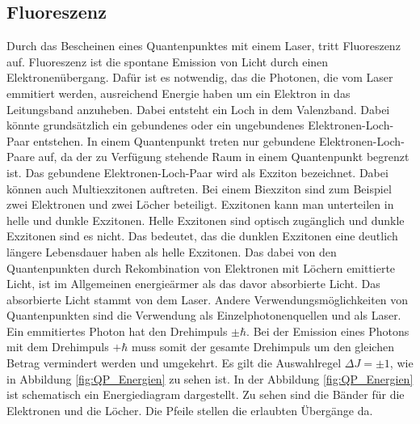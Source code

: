 \subsection{Fluoreszenz}
Durch das Bescheinen eines Quantenpunktes mit einem Laser, tritt Fluoreszenz auf. Fluoreszenz ist die spontane Emission von Licht durch einen Elektronenübergang. Dafür ist es notwendig, das die Photonen, die vom Laser emmitiert werden, ausreichend  Energie haben um ein Elektron in das Leitungsband anzuheben. Dabei entsteht ein Loch in dem Valenzband. Dabei könnte grundsätzlich  ein gebundenes oder ein ungebundenes Elektronen-Loch-Paar entstehen. 
In einem Quantenpunkt treten nur gebundene Elektronen-Loch-Paare auf, da der zu Verfügung stehende  Raum in einem Quantenpunkt begrenzt ist.
 Das gebundene Elektronen-Loch-Paar wird als Exziton bezeichnet. Dabei können auch Multiexzitonen auftreten. Bei einem Biexziton sind zum Beispiel zwei Elektronen und zwei Löcher beteiligt. 
 Exzitonen kann man unterteilen in helle und dunkle Exzitonen. 
 Helle Exzitonen  sind optisch zugänglich und dunkle Exzitonen sind es nicht. 
 Das bedeutet, das die dunklen Exzitonen eine deutlich längere Lebensdauer haben als helle Exzitonen. 
 Das dabei von den Quantenpunkten durch Rekombination von Elektronen mit Löchern emittierte Licht, ist im Allgemeinen energieärmer als das davor absorbierte Licht. Das absorbierte Licht stammt von dem Laser. 
 Andere Verwendungsmöglichkeiten von  Quantenpunkten sind die Verwendung als Einzelphotonenquellen und als Laser.
 Ein emmitiertes Photon hat den Drehimpuls $\pm \hbar$. Bei der Emission eines Photons  mit dem Drehimpuls $+ \hbar$ muss somit der gesamte Drehimpuls um den gleichen Betrag vermindert werden und umgekehrt. Es gilt die Auswahlregel $ \Delta J = \pm 1$, wie in Abbildung \ref{fig:QP_Energien} zu sehen ist. 
 In der Abbildung \ref{fig:QP_Energien} ist schematisch ein Energiediagram dargestellt. Zu sehen sind die Bänder für die Elektronen und die Löcher. Die Pfeile stellen die erlaubten Übergänge da. 
